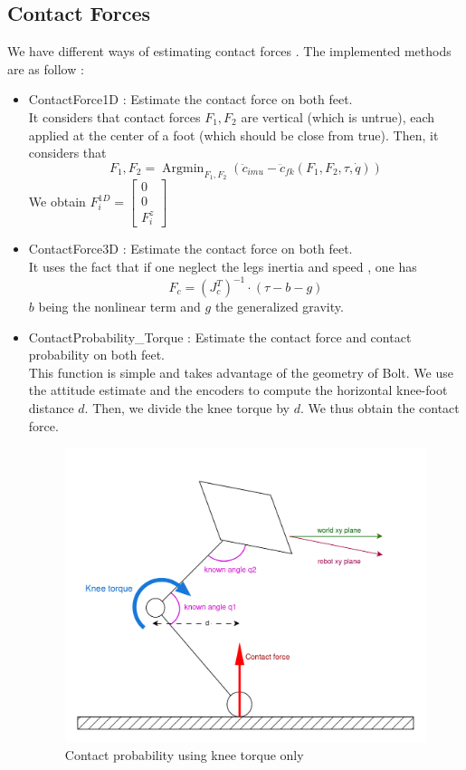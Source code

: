 \documentclass[a4paper,10pt]{article}
\DeclareMathOperator*{\argmin}{Argmin}
\begin{document}
\subsection{Contact Forces}
We have different ways of estimating contact forces \cite{Fourmy_Fayols_2021}\cite{ETH_Zurich}\cite{Git_CRoux}. The implemented methods are as follow :

\begin{itemize}
	\item ContactForce1D : Estimate the contact force on both feet.\\
	It considers that contact forces $F_1, F_2$ are vertical (which is untrue), each applied at the center of a foot (which should be close from true). Then, it considers that 
	$$F_1, F_2 = \argmin_{F_1, F_2}(\ddot c_{imu} - \ddot c_{fk}(F_1, F_2, \tau, \dot q))$$
	We obtain $F_i^{1D} = \begin{bmatrix}0\\ 0\\ F_i^z \end{bmatrix}$ 
	\item ContactForce3D : Estimate the contact force on both feet.\\
	It uses the fact that if one neglect the legs inertia and speed \cite{Camurri_2018} \cite{ETH_Zurich}, one has 
	$$ F_c = (J_c^T)^{-1} \cdot(\tau - b - g)$$
	$b$ being the nonlinear term and $g$ the generalized gravity.
	\item ContactProbability\_Torque : Estimate the contact force and contact probability on both feet.\\
	This function is simple and takes advantage of the geometry of Bolt. We use the attitude estimate and the encoders to compute the horizontal knee-foot distance $d$. Then, we divide the knee torque by $d$. We thus obtain the contact force.
	\begin{figure}[H]
	\label{fig:contact_probability_knee}
	\centering
  	\includegraphics[width=\linewidth, angle=0, scale=0.5]{./images/Bolt_KneeTorque.png}
  	\caption{Contact probability using knee torque only}
	\end{figure}
	
\end{itemize}
\end{document}
